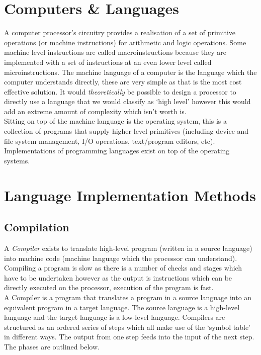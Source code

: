 
\section{Computers \& Languages}
A computer processor's circuitry provides a realisation of a set of primitive operations (or machine instructions) for arithmetic and logic operations. Some machine level instructions are called macroinstructions because they are implemented with a set of instructions at an even lower level called microinstructions. The machine language of a computer is the language which the computer understands directly, these are very simple as that is the most cost effective solution. It would \textit{theoretically} be possible to design a processor to directly use a language that we would classify as `high level' however this would add an extreme amount of complexity which isn't worth is.\\

Sitting on top of the machine language is the operating system, this is a collection of programs that supply higher-level primitives (including device and file system management, I/O operations, text/program editors, etc). Implementations of programming languages exist on top of the operating systems. 

\section{Language Implementation Methods}
\subsection{Compilation}
A \textit{Compiler} exists to translate high-level program (written in a source language) into machine code (machine language which the processor can understand). Compiling a program is slow as there is a number of checks and stages which have to be undertaken however as the output is instructions which can be directly executed on the processor, execution of the program is fast. \\

A Compiler is a program that translates a program in a source language into an equivalent program in a target language. The source language is a high-level language and the target language is a low-level language. Compilers are structured as an ordered series of steps which all make use of the `symbol table' in different ways. The output from one step feeds into the input of the next step. The phases are outlined below.
